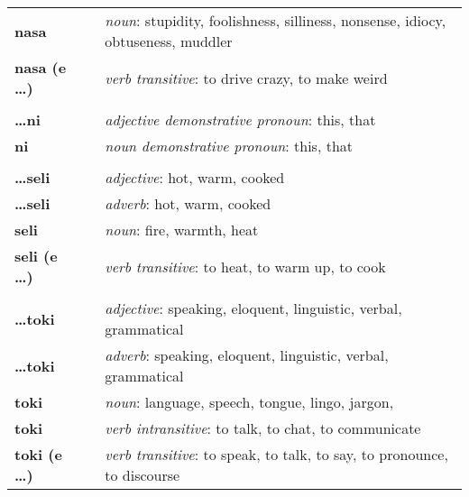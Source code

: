 \begin{supertabular}{p{2,5cm}|ll}
    \textbf{nasa}              &  & \textit{noun}: stupidity, foolishness, silliness, nonsense, idiocy, obtuseness, muddler \\ %
    \textbf{nasa (e \dots)}    &  & \textit{verb transitive}: to drive crazy, to make weird                                 \\ %
                               &  &                                                                                         \\ %
    \textbf{\dots ni}          &  & \textit{adjective demonstrative pronoun}: this, that                                    \\ %
    \textbf{ni}                &  & \textit{noun demonstrative pronoun}: this, that                                         \\ %
                               &  &                                                                                         \\ %
    \textbf{\dots seli}        &  & \textit{adjective}: hot, warm, cooked                                                   \\ %
    \textbf{\dots seli}        &  & \textit{adverb}: hot, warm, cooked                                                      \\ %
    \textbf{seli}              &  & \textit{noun}: fire, warmth, heat                                                       \\ %
    \textbf{seli (e \dots)}    &  & \textit{verb transitive}: to heat, to warm up, to cook                                  \\ %
                               &  &                                                                                         \\ %
    \textbf{\dots toki}        &  & \textit{adjective}: speaking, eloquent, linguistic, verbal, grammatical                 \\ %
    \textbf{\dots toki}        &  & \textit{adverb}: speaking, eloquent, linguistic, verbal, grammatical                    \\ %
    \textbf{toki}              &  & \textit{noun}: language, speech, tongue, lingo, jargon,                                 \\ %
    \textbf{toki}              &  & \textit{verb intransitive}: to talk, to chat, to communicate                            \\ %
    \textbf{toki (e \dots)}    &  & \textit{verb transitive}: to speak, to talk, to say, to pronounce, to discourse         \\ %
\end{supertabular} \\
%
\newpage
%
